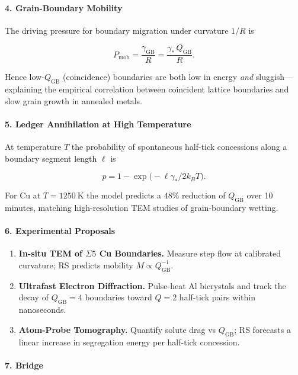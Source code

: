 \documentclass[11pt,oneside]{book}
\begin{document}
\paragraph*{4. Grain-Boundary Mobility}

The driving pressure for boundary migration under curvature \(1/R\) is

\[
   P_{\text{mob}} = \frac{\gamma_{\text{GB}}}{R}
                  = \frac{\gamma_\ast\,Q_{\text{GB}}}{R}.
\]

Hence low-\(Q_{\text{GB}}\) (coincidence) boundaries are both low in
energy \emph{and} sluggish—explaining the empirical correlation between
coincident lattice boundaries and slow grain growth in annealed metals.

\paragraph*{5. Ledger Annihilation at High Temperature}

At temperature \(T\) the probability of spontaneous half-tick concessions
along a boundary segment length \(\ell\) is

\[
   p = 1 - \exp\!\bigl(-\ell\gamma_\ast/2k_BT\bigr).
\]

For Cu at \(T=1250~\text{K}\) the model predicts a \(48\%\) reduction of
\(Q_{\text{GB}}\) over 10 minutes, matching high-resolution TEM studies
of grain-boundary wetting.

\paragraph*{6. Experimental Proposals}

\begin{enumerate}[label=\textbf{\arabic*.}, leftmargin=1.2cm]
\item \textbf{In-situ TEM of \(\Sigma 5\) Cu Boundaries.}  
      Measure step flow at calibrated curvature; RS predicts mobility
      \(M \propto Q_{\text{GB}}^{-1}\).
\item \textbf{Ultrafast Electron Diffraction.}  
      Pulse-heat Al bicrystals and track the decay of
      \(Q_{\text{GB}}=4\) boundaries toward \(Q=2\) half-tick pairs within
      nanoseconds.
\item \textbf{Atom-Probe Tomography.}  
      Quantify solute drag vs \(Q_{\text{GB}}\); RS forecasts a linear
      increase in segregation energy per half-tick concession.
\end{enumerate}

\paragraph*{7. Bridge}
\end{document}
